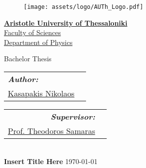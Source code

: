 \begin{titlepage}
\begin{figure}[H]
    \centering
    \texttt{[image: assets/logo/AUTh\_Logo.pdf]}
    \label{fig:cover_auth_logo}
\end{figure}

\centering
\Large \href{https://www.auth.gr/}{\textbf{Aristotle University of Thessaloniki}}\\
\large \href{http://www.sci.auth.gr/}{Faculty of Sciences}\\
\large \href{https://www.physics.auth.gr/}{Department of Physics}

\vspace{18pt}

\large Bachelor Thesis
\vspace{12pt}

\begin{minipage}[t]{0.5\textwidth}
    \raggedright
    \begin{tabular}{ll}
        \textit{\textbf{Author:}} & \\
        \href{https://github.com/kasapakis-nk}{Kasapakis Nikolaos}\footnotemark[1] & \\
    \end{tabular}
\end{minipage}
\begin{minipage}[t]{0.49\textwidth}
    \raggedleft
    \begin{tabular}{rr}
        \textit{\textbf{Supervisor:}} & \\
        \href{http://users.auth.gr/theosama/}{Prof. Theodoros Samaras}\footnotemark[2] & \\
    \end{tabular}
\end{minipage}


\noindent\makebox[\linewidth]{\rule{\textwidth}{0.5pt}}\\[0.2cm]
\LARGE{\textbf{Insert Title Here}}
\noindent\makebox[\linewidth]{\rule{\textwidth}{0.5pt}}\vspace{0.2cm}
\vspace{8pt}
\large\today

\vspace{-10pt}


\end{titlepage}
